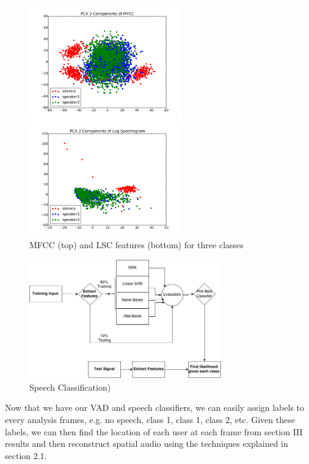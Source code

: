 \documentclass{article}
\begin{document}
\begin{figure}[htb]
\begin{minipage}[b]{0.88\linewidth}
\centerline{\includegraphics[width=6.6cm]{mfcc_2pca.png}}
\centerline{\includegraphics[width=6.6cm]{spectral_log_2pca.png}}
\end{minipage}
\caption{MFCC (top) and LSC features (bottom) for three classes}
\label{fig:res}
\end{figure}

\begin{figure}[htb]
\begin{minipage}[b]{0.88\linewidth}
\centerline{\includegraphics[width=8.3cm]{speech_class.jpg}}
\end{minipage}
\caption{Speech Classification)}
\label{fig:res}
\end{figure}
Now that we have our VAD and speech classifiers, we can easily assign labels to every analysis frames, e.g. no speech, class 1, class 1, class 2, etc. Given these labels, we can then find the location of each user at each frame from section III results and then reconstruct spatial audio using the techniques explained in section 2.1. 
\end{document}

